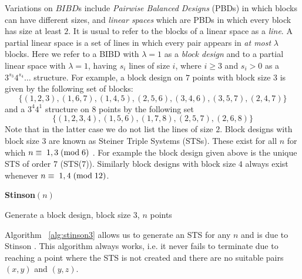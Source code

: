 \documentclass{l4proj}
\begin{document}
\noindent
Variations on $BIBD$s include {\it Pairwise Balanced Designs} (PBDs) in
which blocks can have different sizes, and {\it linear spaces} which
are PBDs in which every block has size at least $2$. It is usual to
refer to the blocks of a linear space as a {\it line}. A partial
linear space is a set of lines in which every pair appears in {\it at most}
$\lambda$ blocks. Here we refer to a BIBD with $\lambda=1$ as a {\it block design} and
to a partial linear space with $\lambda=1$, having $s_{i}$ lines of size $i$, where $i\geq 3$
and $s_{i}>0$ as a $3^{s_{3}}4^{s_{4}}\ldots$ structure.
For example, a block design on $7$ points with block size $3$ is given
by the following set of blocks: $$\{(1,2,3), (1,6,7), (1,4,5), (2,5,6),
(3,4,6), (3,5,7), (2,4,7)\}$$ and a $3^{4}4^{1}$ structure on 8 points by the following set
$$\{(1,2,3,4), (1,5,6), (1,7,8), (2,5,7), (2,6,8)\}$$ Note that in the
latter case we do not list the lines of size $2$. 
Block designs with block size $3$ are known as Steiner Triple
Systems (STSs). These exist for all $n$ for which $n\equiv\;1,3\;({\rm
  mod}\;6)$ \cite{ki}. For example the block design given above is the
unique STS of order $7$ (STS($7$)). Similarly block designs with block
size $4$ always exist whenever $n\equiv\; 1,4\;({\rm mod}\;12)$.



\begin{algorithm}
\DontPrintSemicolon
\textbf{Stinson}$(n)$\;
\nl {}
\caption{Generate a block design, block size $3$, $n$ points}\label{alg:stinson3}
\end{algorithm}


Algorithm ~\ref{alg:stinson3} allows us to generate an STS for
any $n$ and is due to Stinson \cite{krst1}.
This algorithm always works, i.e. it never fails to terminate due to
reaching  a point where
the STS is not created and there are no suitable pairs $(x,y)$ and $(y,z)$.
\end{document}
